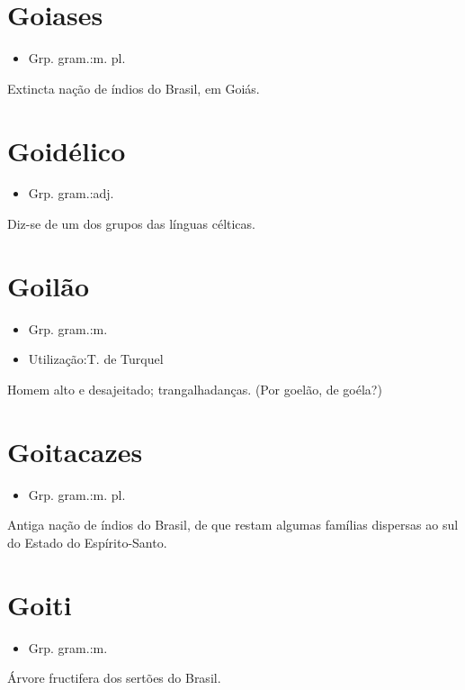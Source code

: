 \section{Goiases}
\begin{itemize}
\item {Grp. gram.:m. pl.}
\end{itemize}
Extincta nação de índios do Brasil, em Goiás.
\section{Goidélico}
\begin{itemize}
\item {Grp. gram.:adj.}
\end{itemize}
Diz-se de um dos grupos das línguas célticas.
\section{Goilão}
\begin{itemize}
\item {Grp. gram.:m.}
\end{itemize}
\begin{itemize}
\item {Utilização:T. de Turquel}
\end{itemize}
Homem alto e desajeitado; trangalhadanças.
(Por \textunderscore goelão\textunderscore , de \textunderscore goéla?\textunderscore )
\section{Goitacazes}
\begin{itemize}
\item {Grp. gram.:m. pl.}
\end{itemize}
Antiga nação de índios do Brasil, de que restam algumas famílias dispersas ao sul do Estado do Espírito-Santo.
\section{Goiti}
\begin{itemize}
\item {Grp. gram.:m.}
\end{itemize}
Árvore fructifera dos sertões do Brasil.
